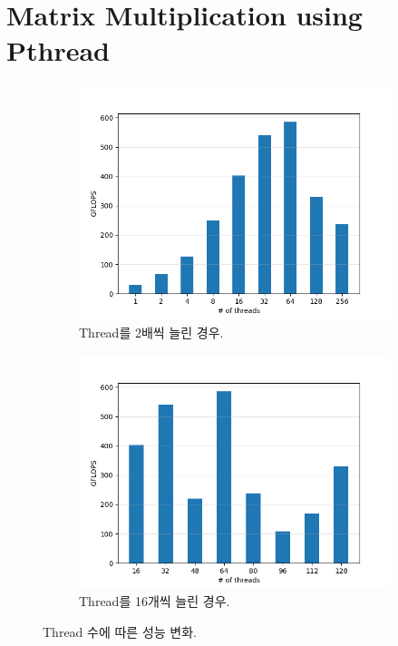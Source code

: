 \section{Matrix Multiplication using Pthread}

\begin{figure}[t]
    \centering
    \begin{subfigure}[b]{0.49\textwidth}
        \centering
        \includegraphics[width=\textwidth]{imgs/gflops_exp.png}
        \caption{Thread를 2배씩 늘린 경우.}\label{fig:gflops_exp}
    \end{subfigure}
    \hfill
    \begin{subfigure}[b]{0.49\textwidth}
        \centering
        \includegraphics[width=\textwidth]{imgs/gflops_lin.png}
        \caption{Thread를 16개씩 늘린 경우.}\label{fig:gflops_lin}
    \end{subfigure}
    \caption{Thread 수에 따른 성능 변화.}\label{fig:gflops}
\end{figure}

